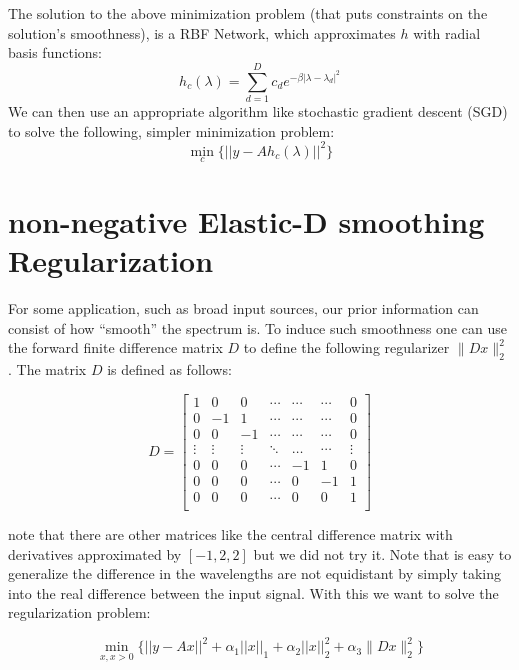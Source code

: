 \documentclass[10pt,a4paper]{article}
\begin{document}
The solution to the above minimization problem (that puts constraints on the solution's smoothness), is a RBF Network, which approximates $h$ with radial basis functions:
\begin{equation}
h_c(\lambda) = \sum_{d=1}^D c_d e^{-\beta |\lambda - \lambda_d|^2}
\end{equation}
We can then use an appropriate algorithm like stochastic gradient descent (SGD) to solve the following, simpler minimization problem:
\begin{equation}
\min_c \Big\{ ||y-Ah_c(\lambda)||^2\Big\}
\end{equation}

\section*{non-negative Elastic-D smoothing Regularization}
For some application, such as broad input sources, our prior information can consist of how ``smooth'' the spectrum is. To induce such smoothness one can use the forward finite difference matrix $D$ to define the following regularizer $\| Dx \|^2_2 $. The matrix $D$ is defined as follows:

\[
   D=
  \left[ {\begin{array}{ccccccc}
   1 & 0 & 0 &  \cdots & \cdots & \cdots & 0\\
   0 & -1 & 1 &  \cdots & \cdots & \cdots & 0\\
   0 & 0 & -1 &  \cdots & \cdots & \cdots & 0\\
   \vdots & \vdots & \vdots &  \ddots & \dots & \cdots & \vdots\\
   0 & 0 & 0 &  \cdots & -1 & 1 & 0\\
   0 & 0 & 0 &  \cdots & 0 & -1 & 1\\
   0 & 0 & 0 &  \cdots & 0 & 0 & 1\\
  \end{array} } \right]
\]

note that there are other matrices like the central difference matrix with derivatives approximated by $[-1 , 2 ,2]$ but we did not try it. Note that is easy to generalize the difference in the wavelengths are not equidistant by simply taking into the real difference between the input signal. With this we want to solve the regularization problem:

\begin{equation}
\min_{x,x>0} \Big\{ ||y-Ax||^2 + \alpha_1 ||x||_1 + \alpha_2 ||x||_2^2 + \alpha_3 \| D x\|^2_2 \Big\}
\end{equation}
\end{document}

